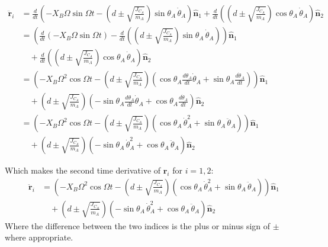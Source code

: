 \documentclass[titlepage]{article}
\begin{document}
\begin{equation}
	\begin{split}
		\ddot{\boldsymbol{r}}_i&=\frac{d}{dt}\left(-X_B\Omega\sin\Omega t-\left(d\pm\sqrt{\frac{J_{C_A}}{m_A}}\right)\sin\theta_A\,\dot{\theta}_A\right)\hat{\boldsymbol{n}}_1+\frac{d}{dt}\left(\left(d\pm\sqrt{\frac{J_{C_A}}{m_A}}\right)\cos\theta_A\,\dot{\theta}_A\right)\hat{\boldsymbol{n}}_2 \\
		&=\left(\frac{d}{dt}\left(-X_B\Omega\sin\Omega t\right)-\frac{d}{dt}\left(\left(d\pm\sqrt{\frac{J_{C_A}}{m_A}}\right)\sin\theta_A\,\dot{\theta}_A\right)\right)\hat{\boldsymbol{n}}_1 \\
		&\quad+\frac{d}{dt}\left(\left(d\pm\sqrt{\frac{J_{C_A}}{m_A}}\right)\cos\theta_A\,\dot{\theta}_A\right)\hat{\boldsymbol{n}}_2 \\
		&=\left(-X_B\Omega^2\cos\Omega t-\left(d\pm\sqrt{\frac{J_{C_A}}{m_A}}\right)\left(\cos\theta_A\frac{d\theta_A}{dt}\dot{\theta}_A+\sin\theta_A\frac{d\dot{\theta}_A}{dt}\right)\right)\hat{\boldsymbol{n}}_1 \\
		&\quad+\left(d\pm\sqrt{\frac{J_{C_A}}{m_A}}\right)\left(-\sin\theta_A\frac{d\theta_A}{dt}\dot{\theta}_A+\cos\theta_A\frac{d\dot{\theta}_A}{dt}\right)\hat{\boldsymbol{n}}_2 \\
		&=\left(-X_B\Omega^2\cos\Omega t-\left(d\pm\sqrt{\frac{J_{C_A}}{m_A}}\right)\left(\cos\theta_A\,\dot{\theta}_A^2+\sin\theta_A\,\ddot{\theta}_A\right)\right)\hat{\boldsymbol{n}}_1 \\
		&\quad+\left(d\pm\sqrt{\frac{J_{C_A}}{m_A}}\right)\left(-\sin\theta_A\,\dot{\theta}_A^2+\cos\theta_A\,\ddot{\theta}_A\right)\hat{\boldsymbol{n}}_2
	\end{split}
\end{equation}
\begin{mdframed}[linewidth=1pt, innertopmargin=10pt, innerbottommargin=10pt]
	Which makes the second time derivative of $\boldsymbol{r}_i$ for $i=1,2$:
	\begin{equation}
		\begin{split}
			\ddot{\boldsymbol{r}}_i&=\left(-X_B\Omega^2\cos\Omega t-\left(d\pm\sqrt{\frac{J_{C_A}}{m_A}}\right)\left(\cos\theta_A\,\dot{\theta}_A^2+\sin\theta_A\,\ddot{\theta}_A\right)\right)\hat{\boldsymbol{n}}_1 \\
			&\quad+\left(d\pm\sqrt{\frac{J_{C_A}}{m_A}}\right)\left(-\sin\theta_A\,\dot{\theta}_A^2+\cos\theta_A\,\ddot{\theta}_A\right)\hat{\boldsymbol{n}}_2
		\end{split}
		\label{eq:c3accel}
	\end{equation}
	Where the difference between the two indices is the plus or minus sign of $\pm$ where appropriate.
\end{mdframed}
\end{document}

